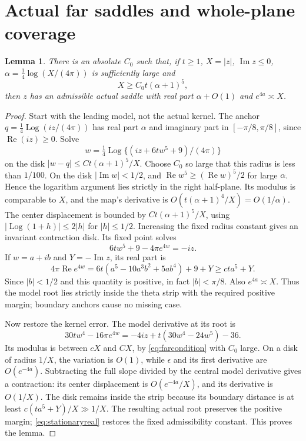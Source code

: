 \documentclass[11pt]{article}
\newtheorem{lemma}[theorem]{Lemma}
\DeclareMathOperator{\Log}{Log}
\begin{document}
\section{Actual far saddles and whole-plane coverage}
\begin{lemma}\label{lem:far}
There is an absolute $C_0$ such that, if $t\geq1$,
$X=|z|$, $\operatorname{Im}z\leq0$,
$\alpha=\tfrac14\log(X/(4\pi))$ is sufficiently large and
\begin{equation}\label{eq:farcondition}
 X\geq C_0t(\alpha+1)^5,
\end{equation}
then $z$ has an admissible actual saddle with real part
$\alpha+O(1)$ and $e^{4a}\asymp X$.
\end{lemma}
\begin{proof}
Start with the leading model, not the actual kernel. The
anchor $q=\tfrac14\Log(iz/(4\pi))$ has real part
$\alpha$ and imaginary part in $[-\pi/8,\pi/8]$,
since $\operatorname{Re}(iz)\geq0$. Solve
\[
 w=\tfrac14\Log\{(iz+6tw^5+9)/(4\pi)\}
\]
on the disk $|w-q|\leq Ct(\alpha+1)^5/X$.
Choose $C_0$ so large that this radius is less than $1/100$.
On the disk $|\operatorname{Im}w|<1/2$, and
$\operatorname{Re}w^5\geq(\operatorname{Re}w)^5/2$
for large $\alpha$. Hence the logarithm argument lies
strictly in the right half-plane. Its modulus is comparable
to $X$, and the map's derivative is
$O(t(\alpha+1)^4/X)=O(1/\alpha)$.
The center displacement is bounded by $Ct(\alpha+1)^5/X$,
using $|\Log(1+h)|\leq2|h|$ for $|h|\leq1/2$.
Increasing the fixed radius constant gives an invariant
contraction disk. Its fixed point solves
\[
 6tw^5+9-4\pi e^{4w}=-iz.
\]
If $w=a+ib$ and $Y=-\operatorname{Im}z$, its real part is
\[
 4\pi\operatorname{Re}e^{4w}
   =6t(a^5-10a^3b^2+5ab^4)+9+Y\geq cta^5+Y.
\]
Since $|b|<1/2$ and this quantity is positive, in fact
$|b|<\pi/8$. Also $e^{4a}\asymp X$. Thus the model root
lies strictly inside the theta strip with the required
positive margin; boundary anchors cause no missing case.

Now restore the kernel error. The model derivative at its
root is
\[
 30tw^4-16\pi e^{4w}
 =-4iz+t(30w^4-24w^5)-36.
\]
Its modulus is between $cX$ and $CX$, by
\eqref{eq:farcondition} with $C_0$ large.
On a disk of radius $1/X$, the variation is $O(1)$,
while $\epsilon$ and its first derivative are $O(e^{-4a})$.
Subtracting the full slope divided by the central model
derivative gives a contraction: its center displacement
is $O(e^{-4a}/X)$, and its derivative is $O(1/X)$.
The disk remains inside the strip because its boundary
distance is at least $c(ta^5+Y)/X\gg1/X$.
The resulting actual root preserves the positive margin;
\eqref{eq:stationaryreal} restores the fixed admissibility
constant. This proves the lemma.
\end{proof}
\end{document}
